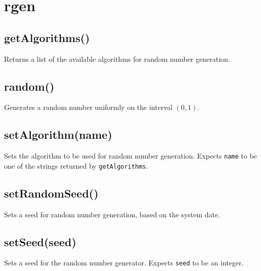 \documentclass{article}
\begin{document}
  \section{rgen}
    \subsection*{getAlgorithms()}
    Returns a list of the available algorithms for random number
generation.


    \subsection*{random()}
    Generates a random number uniformly on the interval $(0, 1)$.


    \subsection*{setAlgorithm(name)}
    Sets the algorithm to be used for random number generation.
Expects \texttt{name} to be one of the strings returned by \texttt{getAlgorithms}.


    \subsection*{setRandomSeed()}
    Sets a seed for random number generation, based on the system date.


    \subsection*{setSeed(seed)}
    Sets a seed for the random number generator.  Expects \texttt{seed} to
be an integer.
\end{document}
